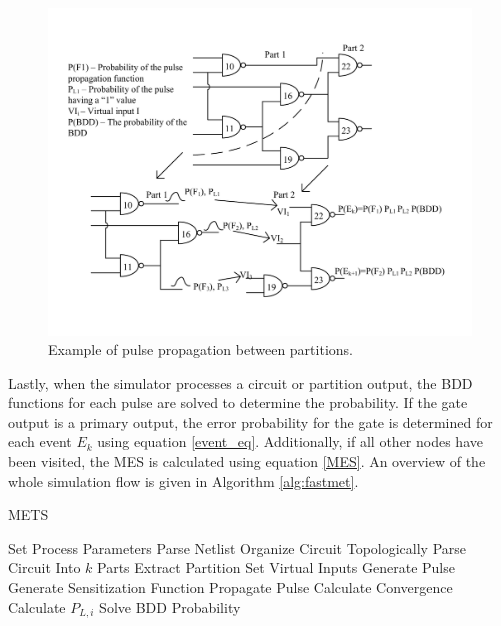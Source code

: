 \documentclass[conference]{IEEEtran}
\begin{document}
\begin{figure}[!htbp]
	\centering
	\includegraphics[width=\linewidth]{Figures/PartProp2}
	\caption{Example of pulse propagation between partitions.}
	\label{PART_PROP}
\end{figure}

\setlength{\abovecaptionskip}{5pt}

\setlength{\belowcaptionskip}{5pt}

Lastly, when the simulator processes a circuit or partition output, the BDD functions for each pulse are solved to determine the probability. If the gate output is a primary output, the error probability for the gate is determined for each event $E_k$ using equation \ref{event_eq}. Additionally, if all other nodes have been visited, the MES is calculated using equation \ref{MES}. An overview of the whole simulation flow is given in Algorithm \ref{alg:fastmet}.

\begin{algorithm}
	\caption{METS} \label{alg:fastmet}
	\begin{algorithmic} [1]
		\STATE Set Process Parameters
		\STATE Parse Netlist
		\STATE Organize Circuit Topologically
		\STATE Parse Circuit Into $k$ Parts
		\STATE Extract Partition
		\STATE Set Virtual Inputs
		\STATE Generate Pulse
		\STATE Generate Sensitization Function
		\STATE Propagate Pulse
		\STATE Calculate Convergence
		\STATE Calculate $P_{L,i}$
		\STATE Solve BDD Probability
		\ENDIF
		\ENDFOR
		\ENDFOR		
	\end{algorithmic}
\end{algorithm}
\end{document}
